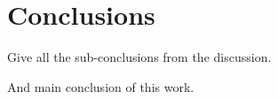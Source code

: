 \chapter{Conclusions}
\label{ch:conclusion}





Give all the sub-conclusions from the discussion.


And main conclusion of this work.






